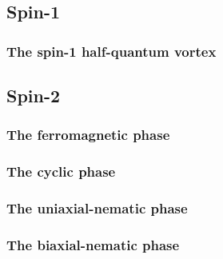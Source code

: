 \subsection{Spin-1}
\subsubsection{The spin-1 half-quantum vortex}

\subsection{Spin-2}

\subsubsection{The ferromagnetic phase}
\subsubsection{The cyclic phase}
\subsubsection{The uniaxial-nematic phase}
\subsubsection{The biaxial-nematic phase}
